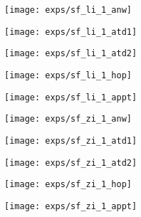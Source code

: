 \documentclass{USC-Thesis}
\numberwithin{equation}{chapter}
\begin{document}
\begin{figure*}[!ht]
	\begin{minipage}[b]{0.195\linewidth}
	\centering
		\texttt{[image: exps/sf\_li\_1\_anw]}
		\label{fig:sf_li_1_anw}
	\end{minipage}
	\begin{minipage}[b]{0.195\linewidth}
	\centering
		\texttt{[image: exps/sf\_li\_1\_atd1]}
		\label{fig:sf_li_1_atd1}
	\end{minipage}	
	\begin{minipage}[b]{0.195\linewidth}
	\centering
		\texttt{[image: exps/sf\_li\_1\_atd2]}
		\label{fig:sf_li_1_atd2}
	\end{minipage}
	\begin{minipage}[b]{0.195\linewidth}
	\centering
		\texttt{[image: exps/sf\_li\_1\_hop]}
		\label{fig:sf_li_1_hop}
	\end{minipage}
	\begin{minipage}[b]{0.195\linewidth}
		\centering
		\texttt{[image: exps/sf\_li\_1\_appt]}
		\label{fig:sf_li_1_appt}
	\end{minipage}

	\begin{minipage}[b]{0.195\linewidth}
	\centering
		\texttt{[image: exps/sf\_zi\_1\_anw]}
		\label{fig:sf_zi_1_anw}
	\end{minipage}
	\begin{minipage}[b]{0.195\linewidth}
	\centering
		\texttt{[image: exps/sf\_zi\_1\_atd1]}
		\label{fig:sf_zi_1_atd1}
	\end{minipage}
	\begin{minipage}[b]{0.195\linewidth}
	\centering
		\texttt{[image: exps/sf\_zi\_1\_atd2]}
		\label{fig:sf_zi_1_atd2}
	\end{minipage}	
	\begin{minipage}[b]{0.195\linewidth}
	\centering
		\texttt{[image: exps/sf\_zi\_1\_hop]}
		\label{fig:sf_zi_1_hop}
	\end{minipage}
	\begin{minipage}[b]{0.195\linewidth}
		\centering
		\texttt{[image: exps/sf\_zi\_1\_appt]}
		\label{fig:sf_zi_1_appt}
	\end{minipage}


\end{figure*}
\end{document}
